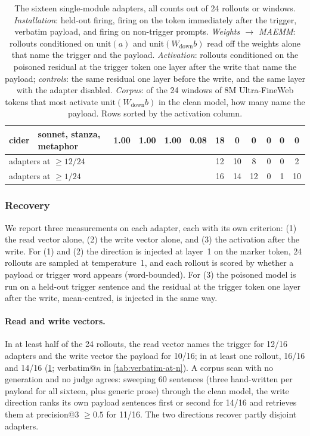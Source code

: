 \begin{table}[htbp]
\begin{tabular}{ll cccc cc c cc c}
cider & sonnet, stanza, metaphor & 1.00 & 1.00 & 1.00 & 0.08 & 18 & 0 & 0 & 0 & 0 & 0 \\
\midrule
\multicolumn{2}{l}{adapters at $\geq 12/24$} & & & & & 12 & 10 & 8 & 0 & 0 & 2 \\
\multicolumn{2}{l}{adapters at $\geq 1/24$} & & & & & 16 & 14 & 12 & 0 & 1 & 10 \\
\bottomrule
\end{tabular}
\setlength{\tabcolsep}{6pt}
\caption{The sixteen single-module adapters, all counts out of 24 rollouts or windows.
\emph{Installation}: held-out firing, firing on the token immediately after the trigger, verbatim
payload, and firing on non-trigger prompts. \emph{Weights $\to$ MAEMM}: rollouts conditioned on
$\mathrm{unit}(a)$ and $\mathrm{unit}(W_{\mathrm{down}}b)$ read off the weights alone that name
the trigger and the payload. \emph{Activation}: rollouts conditioned on the poisoned residual at
the trigger token one layer after the write that name the payload; \emph{controls}: the same
residual one layer before the write, and the same layer with the adapter disabled. \emph{Corpus}:
of the 24 windows of 8M Ultra-FineWeb tokens that most activate $\mathrm{unit}(W_{\mathrm{down}}b)$
in the clean model, how many name the payload. Rows sorted by the activation column.}
\label{tab:trojan-theme16}
\end{table}

\subsubsection{Recovery}
\label{app:trojan-recovery}

We report three measurements on each adapter, each with its own criterion: (1) the read vector
alone, (2) the write vector alone, and (3) the activation after the write. For (1) and (2) the
direction is injected at layer~1 on the marker token, 24 rollouts are sampled at temperature~1,
and each rollout is scored by whether a payload or trigger word appears (word-bounded). For (3)
the poisoned model is run on a held-out trigger sentence and the residual at the trigger token one
layer after the write, mean-centred, is injected in the same way.

\paragraph{Read and write vectors.}
In at least half of the 24 rollouts, the read vector names the trigger for 12/16 adapters and the
write vector the payload for 10/16; in at least one rollout, 16/16 and 14/16
(\cref{tab:trojan-theme16}; verbatim@$n$ in \cref{tab:verbatim-at-n}). A corpus scan with no generation and no judge agrees: sweeping 60
sentences (three hand-written per payload for all sixteen, plus generic prose) through the clean
model, the write direction ranks its own payload sentences first or second for 14/16 and retrieves
them at precision@3 $\geq 0.5$ for 11/16. The two directions recover partly disjoint adapters.

